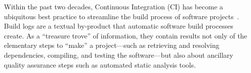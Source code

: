 





Within the past two decades, Continuous Integration (CI) has become a
ubiquitous best practice to streamline the build process of software
projects~\cite{hilton2016usage,beller2017oops,staahl2014modeling}.
Build
logs are a textual by-product that automatic software build processes
create.
As a ``treasure trove'' of information, they contain results
not only of the elementary steps to ``make'' a project---such as
retrieving and resolving dependencies, compiling, and testing the
software---but also about ancillary quality assurance steps such as
automated static analysis tools.

